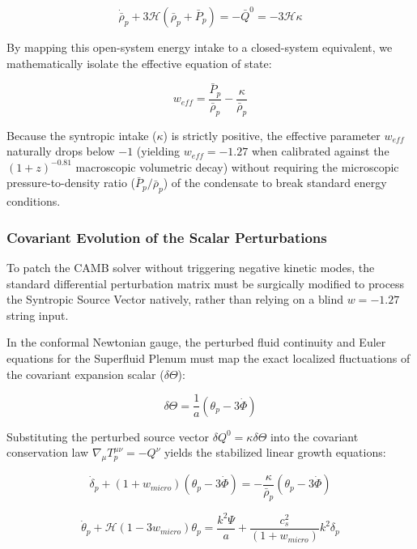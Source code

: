\documentclass[aps,prd,10pt,twocolumn,superscriptaddress,nofootinbib,floatfix]{revtex4-2}
\begin{document}
\begin{equation}
\dot{\bar{\rho}}_p + 3\mathcal{H}(\bar{\rho}_p + \bar{P}_p) = -\bar{Q}^0 = -3\mathcal{H}\kappa
\end{equation}

By mapping this open-system energy intake to a closed-system equivalent, we mathematically isolate the effective equation of state:

\begin{equation}
w_{eff} = \frac{\bar{P}_p}{\bar{\rho}_p} - \frac{\kappa}{\bar{\rho}_p}
\end{equation}

Because the syntropic intake ($\kappa$) is strictly positive, the effective parameter $w_{eff}$ naturally drops below $-1$ (yielding $w_{eff} = -1.27$ when calibrated against the $(1+z)^{-0.81}$ macroscopic volumetric decay) without requiring the microscopic pressure-to-density ratio ($\bar{P}_p/\bar{\rho}_p$) of the condensate to break standard energy conditions.

\subsubsection{Covariant Evolution of the Scalar Perturbations}

To patch the CAMB solver without triggering negative kinetic modes, the standard differential perturbation matrix must be surgically modified to process the Syntropic Source Vector natively, rather than relying on a blind $w = -1.27$ string input.

In the conformal Newtonian gauge, the perturbed fluid continuity and Euler equations for the Superfluid Plenum must map the exact localized fluctuations of the covariant expansion scalar ($\delta\Theta$):

\begin{equation}
\delta\Theta = \frac{1}{a} \left( \theta_p - 3\dot{\Phi} \right)
\end{equation}

Substituting the perturbed source vector $\delta Q^0 = \kappa \delta\Theta$ into the covariant conservation law $\nabla_\mu T_p^{\mu\nu} = -Q^\nu$ yields the stabilized linear growth equations:

\begin{equation}
\dot{\delta}_p + (1+w_{micro}) \left( \theta_p - 3\dot{\Phi} \right) = - \frac{\kappa}{\bar{\rho}_p} (\theta_p - 3\dot{\Phi})
\end{equation}

\begin{equation}
\dot{\theta}_p + \mathcal{H}(1 - 3w_{micro})\theta_p = \frac{k^2 \Psi}{a} + \frac{c_s^2}{(1+w_{micro})} k^2 \delta_p
\end{equation}
\end{document}
